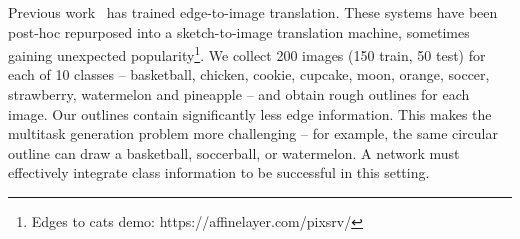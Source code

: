  Previous work~\cite{isola2016image2image,sangkloy2017scribbler,zhu2017unpaired,wang2017high} has trained edge-to-image translation. These systems have been post-hoc repurposed into a sketch-to-image translation machine, sometimes gaining unexpected popularity\footnote{Edges to cats demo: https://affinelayer.com/pixsrv/}. We collect 200 images (150 train, 50 test) for each of 10 classes -- basketball, chicken, cookie, cupcake, moon, orange, soccer, strawberry,  watermelon and pineapple -- and obtain rough outlines for each image. %
Our outlines contain significantly less edge information. This makes the multitask generation problem more challenging -- for example, the same circular outline can draw a basketball, soccerball, or watermelon. A network must effectively integrate class information to be successful in this setting.

